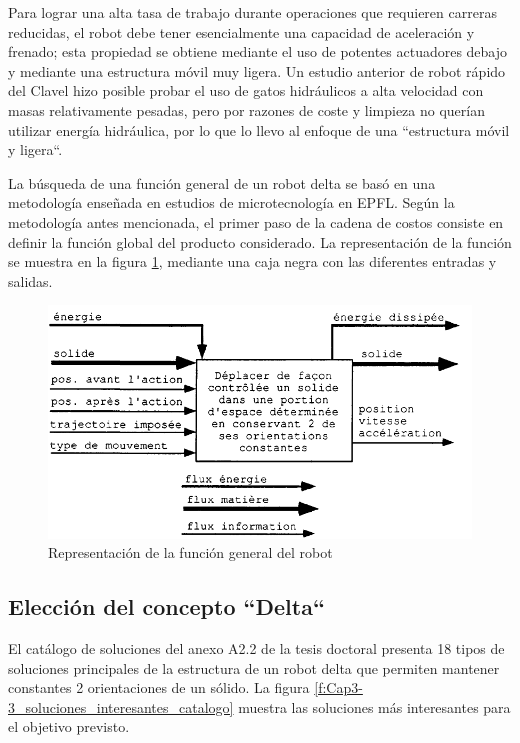     Para lograr una alta tasa de trabajo durante operaciones que requieren carreras reducidas, el robot debe tener esencialmente una capacidad de aceleración y frenado; esta propiedad se obtiene mediante el uso de potentes actuadores debajo y mediante una estructura móvil muy ligera. Un estudio anterior de robot rápido del Clavel hizo posible probar el uso de gatos hidráulicos a alta velocidad con masas relativamente pesadas, pero por razones de coste y limpieza no querían utilizar energía hidráulica, por lo que lo llevo al enfoque de una ``estructura móvil y ligera``.
    
    La búsqueda de una función general de un robot delta se basó en una metodología enseñada en estudios de microtecnología en EPFL. Según la metodología antes mencionada, el primer paso de la cadena de costos consiste en definir la función global del producto considerado. La representación de la función se muestra en la figura \ref{f:Cap3-3_caja_negra_reymond}, mediante una caja negra con las diferentes entradas y salidas.
    
    \begin{figure}[htb]
        \centering
        \includegraphics[width=0.75\linewidth]{Main/Chapter3/Images3/3-3/caja-negra-reymond.png}
        \caption{Representación de la función general del robot \cite{Clavel:31403}}
        \label{f:Cap3-3_caja_negra_reymond}
    \end{figure}
    
    \newpage
    
    \subsection{Elección del concepto ``Delta``}
    El catálogo de soluciones del anexo A2.2 de la tesis doctoral \cite{Clavel:31403} presenta 18 tipos de soluciones principales de la estructura de un robot delta que permiten mantener constantes 2 orientaciones de un sólido. La figura \eqref{f:Cap3-3_soluciones_interesantes_catalogo} muestra las soluciones más interesantes para el objetivo previsto. 

